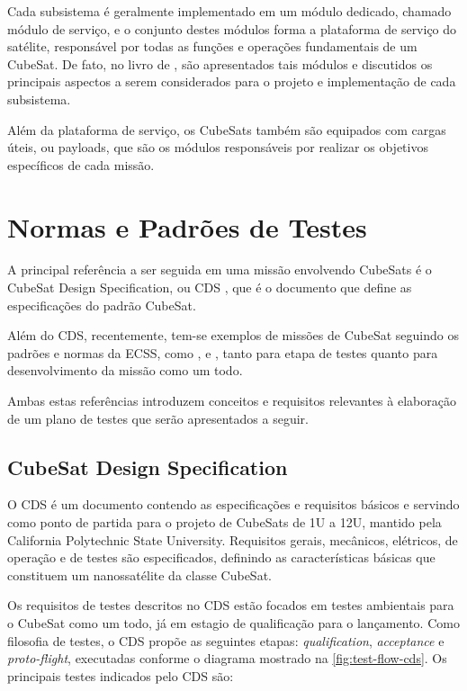 Cada subsistema é geralmente implementado em um módulo dedicado, chamado módulo de serviço, e o conjunto destes módulos forma a plataforma de serviço do satélite, responsável por todas as funções e operações fundamentais de um CubeSat.
De fato,  no livro de \textcite{cappelletti_2020}, são apresentados tais módulos e discutidos os principais aspectos a serem considerados para o projeto e implementação de cada subsistema.

Além da plataforma de serviço, os CubeSats também são equipados com cargas úteis, ou payloads, que são os módulos responsáveis por realizar os objetivos específicos de cada missão.

\section{Normas e Padrões de Testes}\label{sec:normas-ecss}

A principal referência a ser seguida em uma missão envolvendo CubeSats é o CubeSat Design Specification, ou \gls{CDS} \cite{cds}, que é o documento que define as especificações do padrão CubeSat.

Além do \gls{CDS}, recentemente, tem-se exemplos de missões de CubeSat seguindo os padrões e normas da \gls{ECSS}, como \textcite{floripasat-1}, \textcite{tailoring-ecss-nanosat} e \textcite{mist-eps}, tanto para etapa de testes quanto para desenvolvimento da missão como um todo.

Ambas estas referências introduzem conceitos e requisitos relevantes à elaboração de um plano de testes que serão apresentados a seguir.

\subsection{CubeSat Design Specification}

O \gls{CDS} é um documento contendo as especificações e requisitos básicos e servindo como ponto de partida para o projeto de CubeSats de 1U a 12U, mantido pela California Polytechnic State University.
Requisitos gerais, mecânicos, elétricos, de operação e de testes são especificados, definindo as características básicas que constituem um nanossatélite da classe CubeSat.

Os requisitos de testes descritos no \gls{CDS} estão focados em testes ambientais para o CubeSat como um todo, já em estagio de qualificação para o lançamento.
Como filosofia de testes, o \gls{CDS} propõe as seguintes etapas: \textit{qualification}, \textit{acceptance} e \textit{proto-flight}, executadas conforme o diagrama mostrado na \autoref{fig:test-flow-cds}.
Os principais testes indicados pelo \gls{CDS} são:

